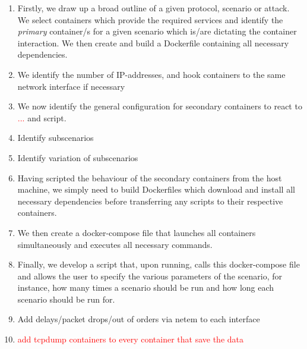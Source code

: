\documentclass[sigconf,anonymous]{acmart}\usepackage[]{graphicx}\usepackage[]{color}
\begin{document}
\begin{enumerate}

\item Firstly, we draw up a broad outline of a given protocol, scenario or attack. We select containers which provide the required services and identify the \textit{primary} container/s for a given scenario which is/are dictating the container interaction. We then create and build a Dockerfile containing all necessary dependencies. 

\item We identify the number of IP-addresses, and hook containers to the same network interface if necessary
  

\item We now identify the general configuration for secondary containers to react to \textcolor{red}{...} and script. 

 
\item Identify subscenarios

\item Identify variation of subscenarios 
 
\item Having scripted the behaviour of the secondary containers from the host machine, we simply need to build Dockerfiles which download and install all necessary dependencies before transferring any scripts to their respective containers.

\item We then create a docker-compose file that launches all containers simultaneously and executes all necessary commands. 

\item Finally, we develop a script that, upon running, calls this docker-compose file and allows the user to specify the various parameters of the scenario, for instance, how many times a scenario should be run and how long each scenario should be run for.

\item Add delays/packet drops/out of orders via netem to each interface

\item \textcolor{red}{add tcpdump containers to every container that save the data}



\end{enumerate}
\end{document}

